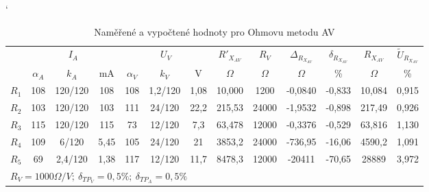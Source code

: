 \documentclass[a4paper, czech]{article}
\begin{document}
\begin{table}[H]
    \catcode`
    \centering
    \caption{Naměřené a vypočtené hodnoty pro Ohmovu metodu AV}
    \begin{tabular}{lcccccccccccc}
        \toprule
        \multirow{2}{*}{} & \multicolumn{3}{c}{$I_A$} & \multicolumn{3}{c}{$U_V$} & $R'_{X_{AV}}$ & $R_V$ & $\Delta_{R_{X_{AV}}}$ & $\delta_{R_{X_{AV}}}$ & $R_{X_{AV}}$ & $\tilde{U}_{R_{X_{AV}}}$ \\
        \cmidrule(rl){2-4}
        \cmidrule(rl){5-7}
        \cmidrule(rl){8-8}
        \cmidrule(rl){9-9}
        \cmidrule(rl){10-10}
        \cmidrule(rl){11-11}
        \cmidrule(rl){12-12}
        \cmidrule(rl){13-13}
        & $\alpha_A$   & $k_A$       & mA     & $\alpha_V$    & $k_V$       & V     & $\Omega$         & $\Omega$    & $\Omega$               & \%              & $\Omega$        & \%          \\
        \midrule
        $R_1$                & 108   & 120/120  & 108   & 108   & 1,2/120  & 1,08  & 10,000    & 1200  & -0,0840         & -0,833          & 10,084   & 0,915       \\
        $R_2$                & 103   & 120/120  & 103   & 111   & 24/120   & 22,2  & 215,53    & 24000 & -1,9532         & -0,898          & 217,49   & 0,926       \\
        $R_3$                & 115   & 120/120  & 115   & 73    & 12/120   & 7,3   & 63,478    & 12000 & -0,3376         & -0,529          & 63,816   & 1,130       \\
        $R_4$                & 109   & 6/120    & 5,45  & 105   & 24/120   & 21    & 3853,2    & 24000 & -736,95         & -16,06          & 4590,2   & 1,091       \\
        $R_5$                & 69    & 2,4/120  & 1,38  & 117   & 12/120   & 11,7  & 8478,3    & 12000 & -20411          & -70,65          & 28889    & 3,972      \\
        \bottomrule
        \multicolumn{12}{l}{$R_V = 1000 \Omega \slash V;\ \delta_{TP_V} = 0,5\%;\ \delta_{TP_A} = 0,5\%$}
    \end{tabular}
\end{table}
\end{document}

